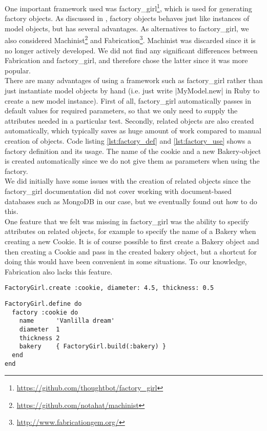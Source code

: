 \MakeShortVerb{\|}

One important framework used was
factory\_girl\footnote{\url{https://github.com/thoughtbot/factory\_girl}},
which is used for generating factory objects. As discussed in
, factory objects behaves just like instances of
model objects, but has several advantages. As alternatives to
factory\_girl, we also considered
Machinist\footnote{\url{https://github.com/notahat/machinist}} and
Fabrication\footnote{\url{http://www.fabricationgem.org/}}. Machinist
was discarded since it is no longer actively developed. We did not find
any significant differences between Fabrication and factory\_girl, and
therefore chose the latter since it was more popular.\\

There are many advantages of using a framework such as factory\_girl
rather than just instantiate model objects by hand (i.e. just write
|MyModel.new| in Ruby to create a new model instance). First of all,
factory\_girl automatically passes in default values for required
parameters, so that we only need to supply the attributes needed in a
particular test. Secondly, related objects are also created
automatically, which typically saves as huge amount of work compared to
manual creation of objects. Code listing \ref{lst:factory_def} and
\ref{lst:factory_use} shows a factory definition and its usage. The name
of the cookie and a new Bakery-object is created automatically since we
do not give them as parameters when using the factory.\\

We did initially have some issues with the creation of related objects
since the factory\_girl documentation did not cover working with
document-based databases such as MongoDB in our case, but we eventually
found out how to do this.\\

One feature that we felt was missing in factory\_girl was the ability to
specify attributes on related objects, for example to specify the name
of a Bakery when creating a new Cookie. It is of course possible to
first create a Bakery object and then creating a Cookie and pass in the
created bakery object, but a shortcut for doing this would have been
convenient in some situations. To our knowledge, Fabrication also lacks
this feature.\\

\begin{lstlisting}[caption=Example usage of the factory defined in code listing \ref{lst:factory_def}.,
                   label=lst:factory_use, float=t]
FactoryGirl.create :cookie, diameter: 4.5, thickness: 0.5
\end{lstlisting}

\begin{lstlisting}[caption=A factory definition for a Cookie model.,
                   label=lst:factory_def, float=t]
FactoryGirl.define do
  factory :cookie do
    name      'Vanlilla dream'
    diameter  1
    thickness 2
    bakery    { FactoryGirl.build(:bakery) }
  end
end
\end{lstlisting}

